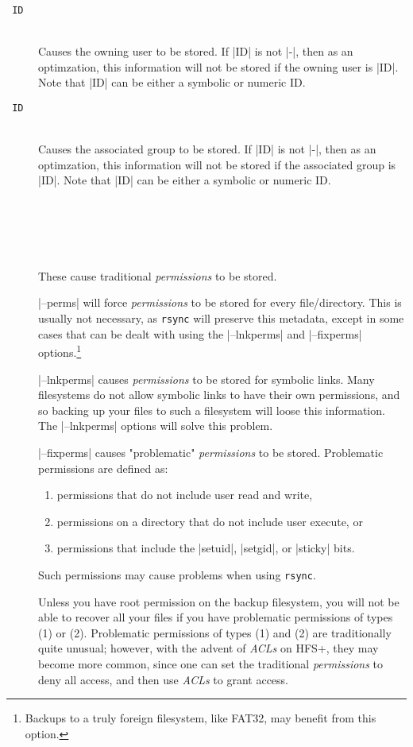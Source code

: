 \documentclass[11pt]{article}
\begin{document}
\begin{description}
\item[{\tt{} ID}] \ \\
Causes the owning user to be stored.
If |ID| is not |-|, then as an optimzation,
this information will not be stored if the owning user is |ID|.
Note that |ID| can be either a symbolic or numeric ID.


\item[{\tt{} ID}] \ \\
Causes the associated group to be stored.
If |ID| is not |-|, then as an optimzation,
this information will not be stored if the associated group is |ID|.
Note that |ID| can be either a symbolic or numeric ID.

\item[{\tt{}}] \ \\[-3ex]
\item[{\tt{}}] \ \\[-3ex]
\item[{\tt{}}] \ \\
These cause traditional \emph{permissions} to be stored.

|--perms| will force \emph{permissions} to be stored for every
file/directory.
This is usually not necessary, as \texttt{rsync} will preserve this metadata,
except in some cases that can be dealt with using the |--lnkperms|
and |--fixperms| options.\footnote{Backups to a truly foreign filesystem, like FAT32,
may benefit from this option.}

|--lnkperms| causes \emph{permissions} to be stored for symbolic links.
Many filesystems do not allow symbolic links to have their own 
permissions, and so backing up your files to such a filesystem
will loose this information.
The |--lnkperms| options will solve this problem.


|--fixperms| causes "problematic" \emph{permissions} to be stored.
Problematic permissions are defined as:
\begin{enumerate}
\item
permissions that do not include user read and write,
\item
permissions on a directory that do not include user execute,
or
\item
permissions that include the |setuid|, |setgid|, or |sticky| bits.
\end{enumerate}
Such permissions may cause problems when using \texttt{rsync}.

Unless you have root permission on the backup filesystem,
you will not be able to recover all your files if you have
problematic permissions of types (1) or (2).
Problematic permissions of types (1) and (2) are traditionally
quite unusual;
however, with the advent of \emph{ACLs} on HFS+, they may become
more common, since one can set the traditional \emph{permissions}
to deny all access, and then use \emph{ACLs} to grant access.


\end{description}
\end{document}
